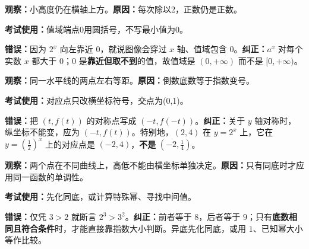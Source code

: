 \clearpage
\begin{trapbox}
\begin{description}[style=nextline,leftmargin=2.8em,labelsep=0.5em,itemsep=0.45em]
  \item[\textbf{\textcolor{CTrap}{易错点四（“接近 $0$”误当“等于 $0$”）}}]


\textbf{观察：}小高度仍在横轴上方。\quad\textbf{原因：}每次除以2，正数仍是正数。

\textbf{考试使用：}值域端点0用圆括号，不写最小值为0。


  \textbf{错误：}因为 $2^x$ 向左靠近 $0$，就说图像会穿过 $x$ 轴、值域包含 $0$。\textbf{纠正：}$a^x$ 对每个实数 $x$ 都大于 $0$；$0$ 是\textbf{靠近但取不到}的值，故值域是 $(0,+\infty)$ 而不是 $[0,+\infty)$。

\end{description}
\end{trapbox}
\clearpage
\begin{trapbox}
\begin{description}[style=nextline,leftmargin=2.8em,labelsep=0.5em,itemsep=0.45em]
  \item[\textbf{\textcolor{CTrap}{易错点五（关于 $y$ 轴对称的点写错）}}]


\textbf{观察：}同一水平线的两点左右等距。\quad\textbf{原因：}倒数底数等于指数变号。

\textbf{考试使用：}对应点只改横坐标符号，交点为(0,1)。


  \textbf{错误：}把 $(t,f(t))$ 的对称点写成 $(-t,f(-t))$。\textbf{纠正：}关于 $y$ 轴对称时，纵坐标不能变，应为 $(-t,f(t))$。特别地，$(2,4)$ 在 $y=2^x$ 上，它在 $y=(\frac12)^x$ 上的对应点是 $(-2,4)$，\textbf{不是} $(-2,\frac14)$。

\end{description}
\end{trapbox}
\clearpage
\begin{trapbox}
\begin{description}[style=nextline,leftmargin=2.8em,labelsep=0.5em,itemsep=0.45em]
  \item[\textbf{\textcolor{CTrap}{易错点六（不同底数硬比较指数）}}]


\textbf{观察：}两个点在不同曲线上，高低不能由横坐标单独决定。\quad\textbf{原因：}只有同底时才应用同一函数的单调性。

\textbf{考试使用：}先化同底，或计算特殊幂、寻找中间值。


  \textbf{错误：}仅凭 $3>2$ 就断言 $2^3>3^2$。\textbf{纠正：}前者等于 $8$，后者等于 $9$；只有\textbf{底数相同且符合条件}时，才能直接靠指数大小判断。异底先化同底，或用 $1$、已知幂大小等作比较。

\end{description}
\end{trapbox}
